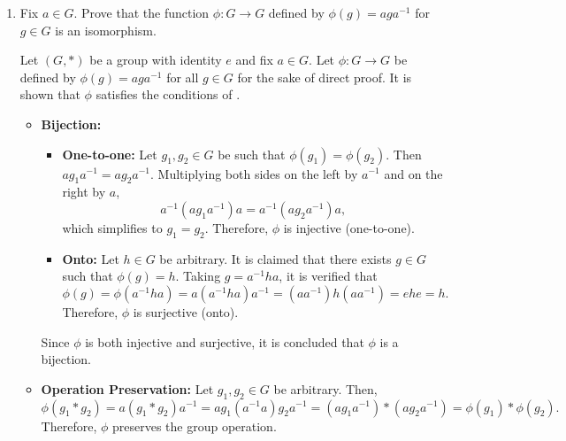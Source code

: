 \begin{enumerate}
\begin{enumerate}
\begin{subprove}
      Therefore, $k$ is the least positive integer such that $(\phi(g))^k = f$.
      By definition of , it is concluded that $\phi(g)$ has order $k$ in $H$.
    \end{subprove}
  \end{enumerate}




  \newpage



  \item Fix $a \in G$. Prove that the function $\phi: G \rightarrow G$ defined by $\phi(g)=a g a^{-1}$ for $g \in G$ is an isomorphism.
  \begin{subprove}
    Let $(G, *)$ be a group with identity $e$ and fix $a \in G$.
    Let $\phi: G \to G$ be defined by $\phi(g) = a g a^{-1}$ for all $g \in G$ for the sake of direct proof.
    It is shown that $\phi$ satisfies the conditions of .
    
    \begin{itemize}
      \item \textbf{Bijection:}
      \begin{itemize}
        \item \textbf{One-to-one:} Let $g_1, g_2 \in G$ be such that $\phi(g_1) = \phi(g_2)$.
        Then $a g_1 a^{-1} = a g_2 a^{-1}$.
        Multiplying both sides on the left by $a^{-1}$ and on the right by $a$,
        \[
          a^{-1} (a g_1 a^{-1}) a = a^{-1} (a g_2 a^{-1}) a,
        \]
        which simplifies to $g_1 = g_2$.
        Therefore, $\phi$ is injective (one-to-one).
        
        \item \textbf{Onto:} Let $h \in G$ be arbitrary.
        It is claimed that there exists $g \in G$ such that $\phi(g) = h$.
        Taking $g = a^{-1} h a$, it is verified that
        \[
          \phi(g) = \phi(a^{-1} h a) = a (a^{-1} h a) a^{-1} = (a a^{-1}) h (a a^{-1}) = e h e = h.
        \]
        Therefore, $\phi$ is surjective (onto).
      \end{itemize}
      Since $\phi$ is both injective and surjective, it is concluded that $\phi$ is a bijection.
      
      \item \textbf{Operation Preservation:} Let $g_1, g_2 \in G$ be arbitrary.
      Then,
      \[
        \phi(g_1 * g_2) = a (g_1 * g_2) a^{-1} = a g_1 (a^{-1} a) g_2 a^{-1} = (a g_1 a^{-1}) * (a g_2 a^{-1}) = \phi(g_1) * \phi(g_2).
      \]
      Therefore, $\phi$ preserves the group operation.
    \end{itemize}
    

\end{subprove}
\end{enumerate}

